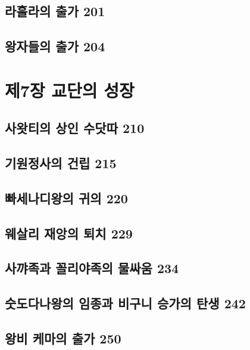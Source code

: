 \documentclass[12pt, a4paper, oneside]{book}
\let\stdsection\section
\renewcommand\section{\newpage\stdsection}
\begin{document}
	\section{라훌라의 출가 201 }

	\section{왕자들의 출가 204}





	\chapter{제7장 교단의 성장}
	\noptcrule
	\parttoc				

	\section{사왓티의 상인 수닷따 210 }

	\section{기원정사의 건립 215 }

	\section{빠세나디왕의 귀의 220 }

	\section{웨살리 재앙의 퇴치 229 }

	\section{사꺄족과 꼴리야족의 물싸움 234 }

	\section{숫도다나왕의 임종과 비구니 승가의 탄생 242 }

	\section{왕비 케마의 출가 250 }
\end{document}
